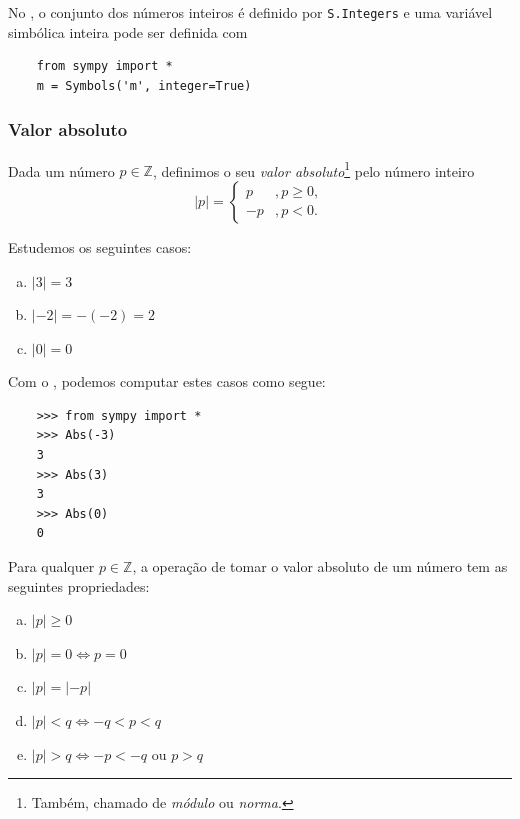 \ifispython
\begin{obs}
  No \sympy, o conjunto dos números inteiros é definido por \lstinline!S.Integers! e uma variável simbólica inteira pode ser definida com
  \begin{lstlisting}
    from sympy import *
    m = Symbols('m', integer=True)
  \end{lstlisting}
\end{obs}
\fi

\subsubsection{Valor absoluto}

Dada um número $p\in\mathbb{Z}$, definimos o seu \emph{valor absoluto}\footnote{Também, chamado de \emph{módulo} ou \emph{norma}.} pelo número inteiro
\begin{equation}\label{eq:racionais_abs}
  |p| = \left\{
    \begin{array}{ll}
      p &, p\geq 0,\\
        -p &, p<0.
    \end{array}
\right.
\end{equation}

\begin{ex}
  Estudemos os seguintes casos:
  \begin{enumerate}[a)]
  \item $|3| = 3$
  \item $|-2| = -(-2) = 2$
  \item $|0| = 0$
  \end{enumerate}
  \ifispython
  Com o {\sympy}, podemos computar estes casos como segue:
  \begin{lstlisting}
    >>> from sympy import *
    >>> Abs(-3)
    3
    >>> Abs(3)
    3
    >>> Abs(0)
    0
  \end{lstlisting}
  \fi
\end{ex}

Para qualquer $p\in\mathbb{Z}$, a operação de tomar o valor absoluto de um número tem as seguintes propriedades:
\begin{enumerate}[a)]
\item $|p|\geq 0$
\item $|p|=0\Leftrightarrow p=0$
\item $|p| = |-p|$
\item $|p|<q\Leftrightarrow -q<p<q$
\item $|p|>q\Leftrightarrow -p<-q\text{ ou }p>q$
\end{enumerate}

